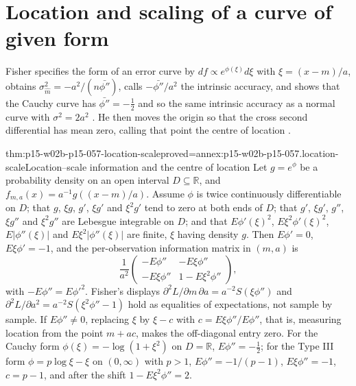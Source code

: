\section{Location and scaling of a curve of given form}
\label{sec:p15-w02b-p15-057-location-scale}

Fisher specifies the form of an error curve by \(df\propto
e^{\phi(\xi)}d\xi\) with \(\xi=(x-m)/a\), obtains
\(\sigma_{\hat m}^2=-a^2/(n\bar{\phi''})\), calls \(-\bar{\phi''}/a^2\) the
intrinsic accuracy, and shows that the Cauchy curve has
\(\bar{\phi''}=-\tfrac12\) and so the same intrinsic accuracy as a normal
curve with \(\sigma^2=2a^2\) \cite[pp.~338--339]{Fisher1922Foundations}.
He then moves the origin so that the cross second differential has mean
zero, calling that point the centre of location
\cite[pp.~339--340]{Fisher1922Foundations}.

\begin{hbtheorem}{thm:p15-w02b-p15-057-location-scale}{proved=annex:p15-w02b-p15-057.location-scale}{Location--scale information and the centre of location}
Let \(g=e^{\phi}\) be a probability density on an open interval
\(D\subseteq\mathbb R\), and \(f_{m,a}(x)=a^{-1}g((x-m)/a)\). Assume
\(\phi\) is twice continuously differentiable on \(D\); that \(g\),
\(\xi g\), \(g'\), \(\xi g'\) and \(\xi^2g'\) tend to zero at both ends of
\(D\); that \(g'\), \(\xi g'\), \(g''\), \(\xi g''\) and \(\xi^2g''\) are
Lebesgue integrable on \(D\); and that \(E\phi'(\xi)^2\),
\(E\xi^2\phi'(\xi)^2\), \(E|\phi''(\xi)|\) and \(E\xi^2|\phi''(\xi)|\) are
finite, \(\xi\) having density \(g\). Then
\(E\phi'=0\), \(E\xi\phi'=-1\), and the per-observation information
matrix in \((m,a)\) is
\[
 \frac1{a^2}\begin{pmatrix}-E\phi''&-E\xi\phi''\\
 -E\xi\phi''&1-E\xi^2\phi''\end{pmatrix},
\]
with \(-E\phi''=E\phi'^2\). Fisher's displays
\(\partial^2L/\partial m\,\partial a=a^{-2}S(\xi\phi'')\) and
\(\partial^2L/\partial a^2=a^{-2}S(\xi^2\phi''-1)\) hold as equalities of
expectations, not sample by sample. If \(E\phi''\neq0\), replacing
\(\xi\) by \(\xi-c\) with \(c=E\xi\phi''/E\phi''\), that is, measuring
location from the point \(m+ac\), makes the off-diagonal entry zero. For
the Cauchy form \(\phi(\xi)=-\log(1+\xi^2)\) on \(D=\mathbb R\),
\(E\phi''=-\tfrac12\); for the Type III form \(\phi=p\log\xi-\xi\) on
\((0,\infty)\) with \(p>1\), \(E\phi''=-1/(p-1)\), \(E\xi\phi''=-1\),
\(c=p-1\), and after the shift \(1-E\xi^2\phi''=2\).
\end{hbtheorem}

